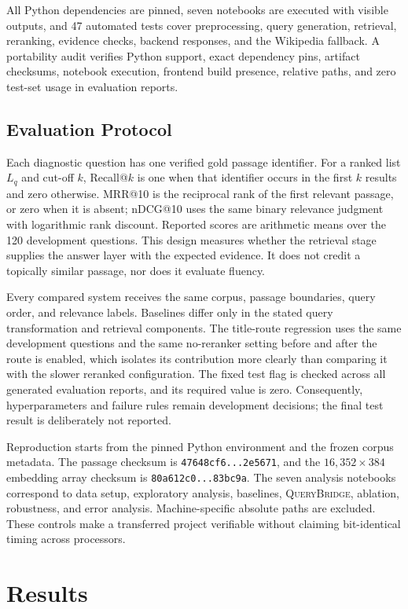 \documentclass[conference]{IEEEtran}
\newcommand{\querybridge}{\textsc{QueryBridge}}
\begin{document}
All Python dependencies are pinned, seven notebooks are executed with visible outputs, and 47 automated tests cover preprocessing, query generation, retrieval, reranking, evidence checks, backend responses, and the Wikipedia fallback. A portability audit verifies Python support, exact dependency pins, artifact checksums, notebook execution, frontend build presence, relative paths, and zero test-set usage in evaluation reports.

\subsection{Evaluation Protocol}
Each diagnostic question has one verified gold passage identifier. For a ranked list $L_q$ and cut-off $k$, Recall@$k$ is one when that identifier occurs in the first $k$ results and zero otherwise. MRR@10 is the reciprocal rank of the first relevant passage, or zero when it is absent; nDCG@10 uses the same binary relevance judgment with logarithmic rank discount. Reported scores are arithmetic means over the 120 development questions. This design measures whether the retrieval stage supplies the answer layer with the expected evidence. It does not credit a topically similar passage, nor does it evaluate fluency.

Every compared system receives the same corpus, passage boundaries, query order, and relevance labels. Baselines differ only in the stated query transformation and retrieval components. The title-route regression uses the same development questions and the same no-reranker setting before and after the route is enabled, which isolates its contribution more clearly than comparing it with the slower reranked configuration. The fixed test flag is checked across all generated evaluation reports, and its required value is zero. Consequently, hyperparameters and failure rules remain development decisions; the final test result is deliberately not reported.

Reproduction starts from the pinned Python environment and the frozen corpus metadata. The passage checksum is \texttt{47648cf6...2e5671}, and the $16{,}352\times384$ embedding array checksum is \texttt{80a612c0...83bc9a}. The seven analysis notebooks correspond to data setup, exploratory analysis, baselines, \querybridge, ablation, robustness, and error analysis. Machine-specific absolute paths are excluded. These controls make a transferred project verifiable without claiming bit-identical timing across processors.

\section{Results}
\end{document}
